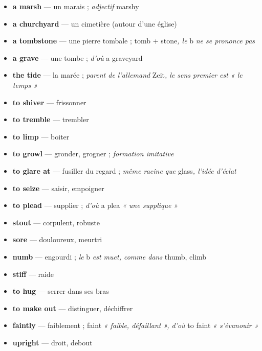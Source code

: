 \documentclass{fiche}
\begin{document}

\begin{itemize}[label=--,itemsep=0.8mm,leftmargin=*]\small
  \item \textbf{a marsh} — un marais ; \textit{adjectif} marshy
  \item \textbf{a churchyard} — un cimetière (autour d'une église)
  \item \textbf{a tombstone} — une pierre tombale ; tomb + stone\textit{, le} b \textit{ne se prononce pas}
  \item \textbf{a grave} — une tombe ; \textit{d'où} a graveyard
  \item \textbf{the tide} — la marée ; \textit{parent de l'allemand} Zeit\textit{, le sens premier est « le temps »}
  \item \textbf{to shiver} — frissonner
  \item \textbf{to tremble} — trembler
  \item \textbf{to limp} — boiter
  \item \textbf{to growl} — gronder, grogner ; \textit{formation imitative}
  \item \textbf{to glare at} — fusiller du regard ; \textit{même racine que} glass\textit{, l'idée d'éclat}
  \item \textbf{to seize} — saisir, empoigner
  \item \textbf{to plead} — supplier ; \textit{d'où} a plea \textit{« une supplique »}
  \item \textbf{stout} — corpulent, robuste
  \item \textbf{sore} — douloureux, meurtri
  \item \textbf{numb} — engourdi ; \textit{le} b \textit{est muet, comme dans} thumb, climb
  \item \textbf{stiff} — raide
  \item \textbf{to hug} — serrer dans ses bras
  \item \textbf{to make out} — distinguer, déchiffrer
  \item \textbf{faintly} — faiblement ; faint \textit{« faible, défaillant », d'où} to faint \textit{« s'évanouir »}
  \item \textbf{upright} — droit, debout
\end{itemize}
\end{document}
